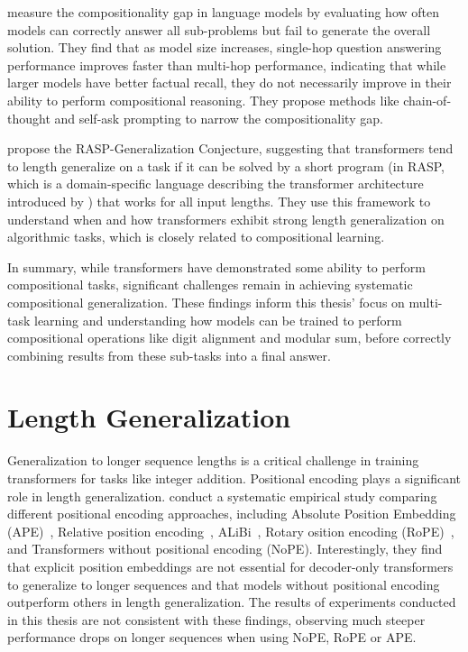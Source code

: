 \cite{press_measuring_2023} measure the compositionality gap in language models by evaluating how often models can correctly answer all sub-problems but fail to generate the overall solution. They find that as model size increases, single-hop question answering performance improves faster than multi-hop performance, indicating that while larger models have better factual recall, they do not necessarily improve in their ability to perform compositional reasoning. They propose methods like chain-of-thought and self-ask prompting to narrow the compositionality gap.

\cite{zhou_what_2023} propose the RASP-Generalization Conjecture, suggesting that transformers tend to length generalize on a task if it can be solved by a short program (in RASP, which is a domain-specific language describing the transformer architecture introduced by \cite{weiss_thinking_2021}) that works for all input lengths. They use this framework to understand when and how transformers exhibit strong length generalization on algorithmic tasks, which is closely related to compositional learning.

In summary, while transformers have demonstrated some ability to perform compositional tasks, significant challenges remain in achieving systematic compositional generalization. These findings inform this thesis' focus on multi-task learning and understanding how models can be trained to perform compositional operations like digit alignment and modular sum, before correctly combining results from these sub-tasks into a final answer.

\section{Length Generalization}\label{sec:sota_length_generalization}

Generalization to longer sequence lengths is a critical challenge in training transformers for tasks like integer addition. Positional encoding plays a significant role in length generalization. \cite{kazemnejad_impact_2023} conduct a systematic empirical study comparing different positional encoding approaches, including Absolute Position Embedding (APE)~\parencite{vaswani_attention_2017}, Relative position encoding~\parencite{shaw_self-attention_2018}, ALiBi~\parencite{press_train_2021}, Rotary osition encoding (RoPE)~\parencite{su_roformer_2024}, and Transformers without positional encoding (NoPE). Interestingly, they find that explicit position embeddings are not essential for decoder-only transformers to generalize to longer sequences and that models without positional encoding outperform others in length generalization. The results of experiments conducted in this thesis are not consistent with these findings, observing much steeper performance drops on longer sequences when using NoPE, RoPE or APE.

